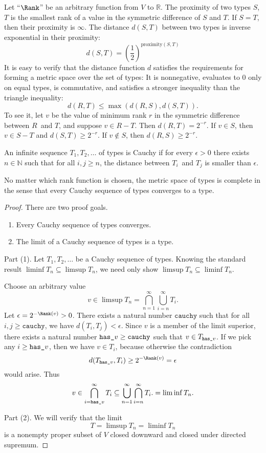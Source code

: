 
Let ``$\Rank$'' be an arbitrary function from $V$ to $\mathbb R$.
The proximity of two types $S$, $T$ is the smallest rank of a
value in the symmetric difference of $S$ and $T$. If $S=T$, then
their proximity is $\infty$. The distance $d(S, T)$ between two
types is inverse exponential in their proximity:
\[
d(S,T) =
\left(\frac12\right)^{\mathrm{proximity}(S, T)}
 \]
It is easy to verify that the distance function $d$ satisfies the
requirements for forming a metric space over the set of types:
It is nonnegative, evaluates to $0$ only on equal types, is
commutative, and satisfies a stronger inequality than the
triangle inequality:
\[
d(R,T)\le\max(d(R,S),d(S,T)).
\]
To see it, let $v$ be the value of minimum rank $r$ in the
symmetric difference between $R$~and $T$, and suppose $v\in R-T$.
Then $d(R, T)=2^{-r}$. If $v\in S$, then $v\in S-T$ and
$d(S,T)\ge2^{-r}$. If $v\notin S$, then $d(R, S)\ge2^{-r}$.


An infinite sequence $T_1,T_2,\ldots$ of types is Cauchy if for
every $\epsilon > 0$ there exists $n\in\mathbb N$ such that for
all $i,j\ge n$, the distance between $T_i$~and $T_j$ is smaller
than $\epsilon$.

\begin{theorem}
No matter which rank function is chosen, the metric space of
types is complete in the sense that every Cauchy sequence of
types converges to a type.
\end{theorem}

\begin{proof}
There are two proof goals.
\begin{enumerate}
\item Every Cauchy sequence of types converges.
\item The limit of a Cauchy sequence of types is a type.
\end{enumerate}

Part (1). Let $T_1,T_2,\ldots$ be a Cauchy sequence of types.
Knowing the standard result $\liminf T_n\subseteq\limsup T_n$,
we need only show $\limsup T_n\subseteq\liminf T_n$.

\def\Cauchy{\texttt{cauchy}}
\def\Hasv{{\texttt{has\textunderscore}v}}

Choose an arbitrary value
\[
v\in \limsup T_n = \bigcap_{n=1}^\infty\bigcup_{i = n}^\infty T_i.
\]
Let $\epsilon=2^{-\Rank(v)}>0$. There exists a natural number
$\Cauchy$ such that for all $i,j\ge\Cauchy$, we have
$d(T_i,T_j)<\epsilon$. Since $v$ is a member of the limit
superior, there exists a natural number $\Hasv\ge\Cauchy$ such
that $v\in T_\Hasv$. If we pick any $i\ge\Hasv$, then we have
$v\in T_i$, because otherwise the contradiction
\[
d(T_\Hasv, T_i)\ge2^{-\Rank(v)}=\epsilon
\]
would arise. Thus
\[
v\in
\bigcap_{i=\Hasv}^\infty T_i\subseteq
\bigcup_{n=1}^\infty\bigcap_{i = n}^\infty T_i.
=\liminf T_n.
\]

Part (2). We will verify that the limit
\[
T=\limsup T_n=\liminf T_n
\]
is a nonempty proper subset of $V$ closed downward and closed
under directed supremum.
\end{proof}
